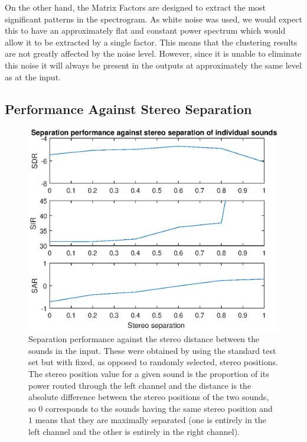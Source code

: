 \documentclass[10pt,twoside,a4paper]{report}
\begin{document}
On the other hand, the Matrix Factors are designed to extract the most significant patterns in the spectrogram. As white noise was used, we would expect this to have an approximately flat and constant power spectrum which would allow it to be extracted by a single factor. This means that the clustering results are not greatly affected by the noise level. However, since it is unable to eliminate this noise it will always be present in the outputs at approximately the same level as at the input.

\subsection{Performance Against Stereo Separation}


\begin{figure}
\centering
\includegraphics[width=0.7\linewidth]{./StereoPlots}
\caption{Separation performance against the stereo distance between the sounds in the input. These were obtained by using the standard test set but with fixed, as opposed to randomly selected, stereo positions. The stereo position value for a given sound is the proportion of its power routed through the left channel and the distance is the absolute difference between the stereo positions of the two sounds, so $ 0 $ corresponds to the sounds having the same stereo position and $ 1 $ means that they are maximally separated (one is entirely in the left channel and the other is entirely in the right channel).}
\label{fig:StereoPlots}
\end{figure}
\end{document}
